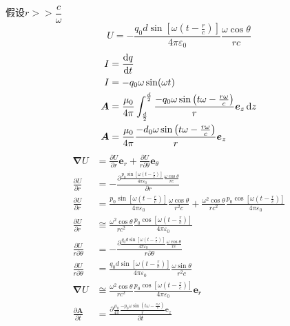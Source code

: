 假设$r>>\dfrac{c}{\omega}$
\begin{equation}
    U=-\frac{q_0d\sin\left[\omega\left(t-\frac{r}{c}\right)\right]}{4\pi\varepsilon_0}\frac{
    \omega \cos\theta}{rc}
\end{equation}
\begin{align}
    I&=\frac{\dif q}{\dif t}\nonumber\\
    I&=-q_0\omega\sin(\omega t)\nonumber\\
    \boldsymbol{A}&=\frac{\mu_0}{4\pi}\int_{\frac{d}{2}}^{\frac{d}{2}}\frac{-q_0\omega\sin\left(t\omega-\frac{r\omega}{c}\right)}{r}\boldsymbol{e}_z\dif z\nonumber\\
    \boldsymbol{A}&=\frac{\mu_0}{4\pi}\frac{-d_0\omega\sin\left(t\omega-\frac{r\omega}{c}\right)}{r}\boldsymbol{e}_z
\end{align}
\begin{align}
    \boldsymbol{\nabla}U&=\frac{\partial U}{\partial r}\boldsymbol{e}_r+\frac{\partial U}{r\partial \theta}\boldsymbol{e}_\theta\nonumber\\
    \frac{\partial U}{\partial r}&=-\frac{\partial \frac{p_0\sin\left[\omega\left(t-\frac{r}{c}\right)\right]}{4\pi\varepsilon_0}\frac{
    \omega \cos\theta}{rc}}{\partial r}\nonumber\\
    \frac{\partial U}{\partial r}&=\frac{p_0\sin\left[\omega\left(t-\frac{r}{c}\right)\right]}{4\pi\varepsilon_0}\frac{
    \omega \cos\theta}{r^2c}
    +\frac{\omega^2 \cos\theta}{rc^2}\frac{p_0\cos\left[\omega\left(t-\frac{r}{c}\right)\right]}{4\pi\varepsilon_0}\nonumber\\
    \frac{\partial U}{\partial r}&\cong\frac{\omega^2 \cos\theta}{rc^2}\frac{p_0\cos\left[\omega\left(t-\frac{r}{c}\right)\right]}{4\pi\varepsilon_0}\nonumber\\
    \frac{\partial U}{r\partial \theta}&=-\frac{\partial \frac{q_0d\sin\left[\omega\left(t-\frac{r}{c}\right)\right]}{4\pi\varepsilon_0}\frac{
    \omega \cos\theta}{rc}}{r\partial \theta}\nonumber\\
    \frac{\partial U}{r\partial \theta}&=\frac{q_0d\sin\left[\omega\left(t-\frac{r}{c}\right)\right]}{4\pi\varepsilon_0}\frac{
    \omega \sin\theta}{r^2c}\nonumber\\
    \boldsymbol{\nabla}U&\cong\frac{\omega^2 \cos\theta}{rc^2}\frac{p_0\cos\left[\omega\left(t-\frac{r}{c}\right)\right]}{4\pi\varepsilon_0}\boldsymbol{e}_r\\
    \frac{\partial \boldsymbol{A}}{\partial t}&=\frac{\partial \frac{\mu_0}{4\pi}\frac{-p_0\omega\sin\left(t\omega-\frac{r\omega}{c}\right)}{r}\boldsymbol{e}_z}{\partial t}\nonumber\\

\end{align}
